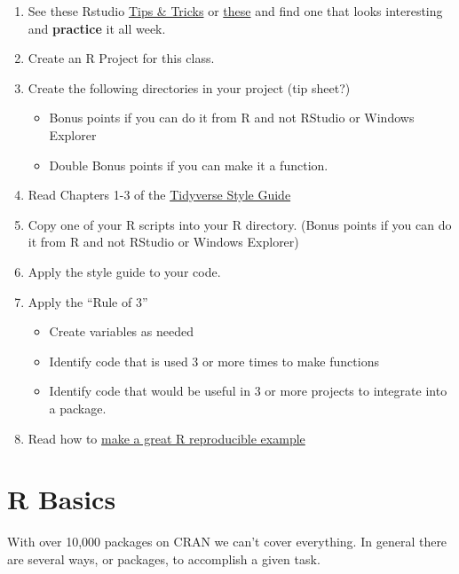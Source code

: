\documentclass[]{book}
\providecommand{\tightlist}{%
  \setlength{\itemsep}{0pt}\setlength{\parskip}{0pt}}
\theoremstyle{definition}
\theoremstyle{definition}
\theoremstyle{definition}
\theoremstyle{remark}
\begin{document}
\begin{enumerate}
\def\labelenumi{\arabic{enumi}.}
\tightlist
\item
  See these Rstudio
  \href{https://rviews.rstudio.com/categories/tips-and-tricks/}{Tips \&
  Tricks} or \href{https://twitter.com/rstudiotips}{these} and find one
  that looks interesting and \textbf{practice} it all week.
\item
  Create an R Project for this class.
\item
  Create the following directories in your project (tip sheet?)

  \begin{itemize}
  \tightlist
  \item
    Bonus points if you can do it from R and not RStudio or Windows
    Explorer
  \item
    Double Bonus points if you can make it a function.
  \end{itemize}
\item
  Read Chapters 1-3 of the
  \href{http://style.tidyverse.org/index.html}{Tidyverse Style Guide}
\item
  Copy one of your R scripts into your R directory. (Bonus points if you
  can do it from R and not RStudio or Windows Explorer)
\item
  Apply the style guide to your code.\\
\item
  Apply the ``Rule of 3''

  \begin{itemize}
  \tightlist
  \item
    Create variables as needed
  \item
    Identify code that is used 3 or more times to make functions
  \item
    Identify code that would be useful in 3 or more projects to
    integrate into a package.
  \end{itemize}
\item
  Read how to
  \href{https://stackoverflow.com/questions/5963269/how-to-make-a-great-r-reproducible-example}{make
  a great R reproducible example}
\end{enumerate}

\chapter{R Basics}\label{r-basics}

With over 10,000 packages on CRAN we can't cover everything. In general
there are several ways, or packages, to accomplish a given task.
\end{document}
